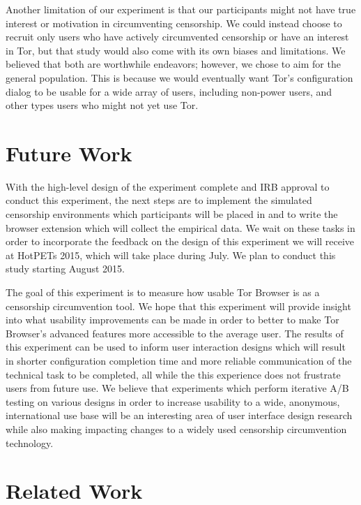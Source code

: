 \documentclass[letterpaper,twocolumn,11pt]{article}
\begin{document}
Another limitation of our experiment is that our participants might not have true interest or motivation in
circumventing censorship. We could instead choose to recruit only users who have actively circumvented
censorship or have an interest in Tor, but that study would also come with its own biases and limitations.
We believed that both are worthwhile endeavors; however, we chose to aim for the general population. 
This is because we would eventually want Tor's configuration dialog to be usable for a wide array of users, 
including non-power users, and other types users who might not yet use Tor. 

\section{Future Work}
\indent \indent With the high-level design of the experiment complete and IRB approval  to conduct this
experiment,  the next steps are to implement the simulated censorship environments which participants 
will be placed in and to write the browser extension which will collect the empirical data. 
We wait on these tasks in order to incorporate the feedback on the design of this experiment 
we will receive at HotPETs 2015, which will take place during July. We plan to conduct this study starting 
August 2015. 

The goal of this experiment is to measure how usable Tor Browser is as a censorship circumvention
tool. We hope that this experiment will provide insight into what usability improvements can be made 
in order to better to make Tor Browser's advanced features more accessible to the average user. The results
of this experiment can be used to inform user interaction designs which will result in shorter configuration
completion time and more reliable communication of the technical task to be completed, all while the 
this experience does not frustrate users from future use. We believe that experiments which perform
iterative A/B testing on various designs in order to increase usability to a wide, anonymous, international 
use base will be an interesting area of user interface design research while also making impacting changes
to a widely used censorship circumvention technology. 

\section{Related Work}
\end{document}
